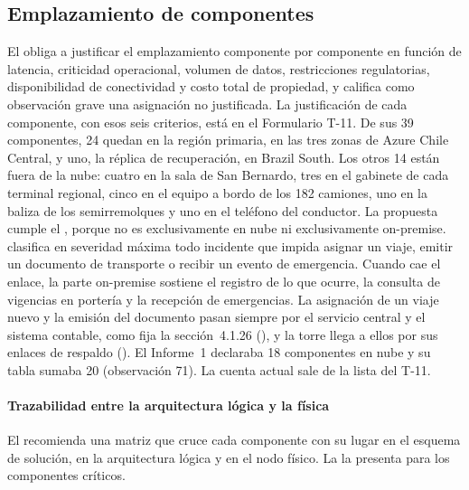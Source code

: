 \subsection{Emplazamiento de componentes}\label{sec:4-emplazamiento}

El  obliga a justificar el emplazamiento componente por componente en función de
latencia, criticidad operacional, volumen de datos, restricciones regulatorias, disponibilidad de
conectividad y costo total de propiedad, y califica como observación grave una asignación no
justificada. La justificación de cada componente, con esos seis criterios, está en el Formulario T-11. De sus 39
componentes, 24 quedan en la región primaria, en las tres zonas de Azure Chile Central, y uno, la
réplica de recuperación, en Brazil South. Los otros 14 están fuera de la nube: cuatro en la sala de San
Bernardo, tres en el gabinete de cada terminal regional, cinco en el equipo a bordo de los 182 camiones,
uno en la baliza de los semirremolques y uno en el teléfono del conductor. La propuesta cumple el
, porque no es exclusivamente en nube ni exclusivamente on-premise. 
clasifica en severidad máxima todo incidente que impida asignar un viaje, emitir un documento de
transporte o recibir un evento de emergencia. Cuando cae el enlace, la parte on-premise sostiene el
registro de lo que ocurre, la consulta de vigencias en portería y la recepción de emergencias. La
asignación de un viaje nuevo y la emisión del documento pasan siempre por el servicio central y el
sistema contable, como fija la sección~4.1.26 (), y la torre llega a
ellos por sus enlaces de respaldo (). El Informe~1
declaraba 18 componentes en nube y su tabla sumaba 20 (observación 71). La cuenta actual sale de la
lista del T-11.

\paragraph{Trazabilidad entre la arquitectura lógica y la física} El 
recomienda una matriz que cruce cada componente con su lugar en el esquema de solución, en la
arquitectura lógica y en el nodo físico. La  la presenta para los componentes
críticos.

